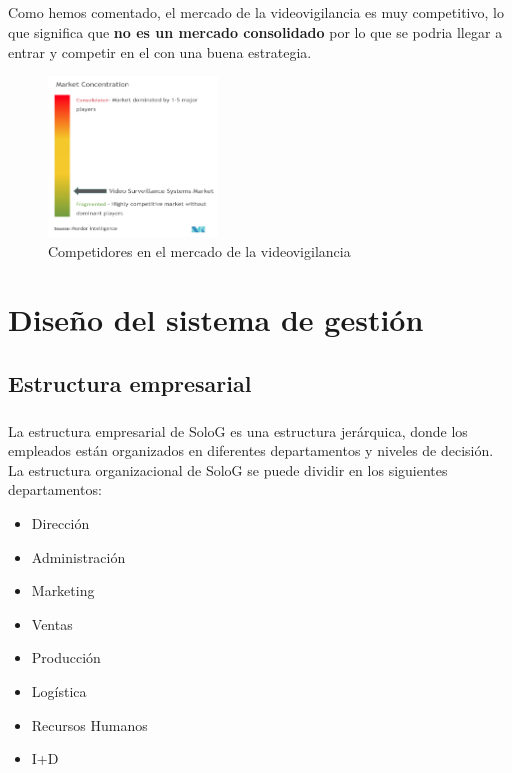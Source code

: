 \documentclass{report}
\begin{document}
        \paragraph*{}{Como hemos comentado, el mercado de la videovigilancia es muy competitivo, lo que significa que \textbf{no es un mercado consolidado} por lo que se podria llegar a entrar y competir en el con una buena estrategia.}
        \begin{figure}[H]
          \centering
          \includegraphics[width=0.4\textwidth]{./img/competidores.png}
          \caption{Competidores en el mercado de la videovigilancia}
        \end{figure}
    \chapter{Diseño del sistema de gestión}
        \section{Estructura empresarial} %
          \paragraph*{}
          {
            La estructura empresarial de SoloG es una estructura jerárquica, donde los empleados están organizados en diferentes departamentos y niveles de decisión. La estructura organizacional de SoloG se puede dividir en los siguientes departamentos:
          }
            \begin{multicols}{2}
              \begin{itemize}
                \item Dirección
                \item Administración
                \item Marketing
                \item Ventas
                \item Producción
                \item Logística
                \item Recursos Humanos
                \item I+D
              \end{itemize}
            \end{multicols}
\end{document}
